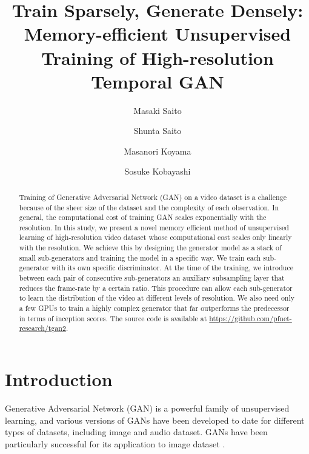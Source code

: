 \documentclass[twocolumn]{svjour3}
\begin{document}
\title{Train Sparsely, Generate Densely: Memory-efficient Unsupervised Training of High-resolution Temporal GAN}




\author{Masaki Saito \and Shunta Saito \and Masanori Koyama \and Sosuke Kobayashi}




\date{}



\maketitle

\begin{abstract}
Training of Generative Adversarial Network (GAN) on a video dataset is a challenge because of the sheer size of the dataset and the complexity of each observation.
In general, the computational cost of training GAN scales exponentially with the resolution.
In this study, we present a novel memory efficient method of unsupervised learning of high-resolution video dataset whose computational cost scales only linearly with the resolution.
We achieve this by designing the generator model as a stack of small sub-generators and training the model in a specific way.
We train each sub-generator with its own specific discriminator.
At the time of the training, we introduce between each pair of consecutive sub-generators an auxiliary subsampling layer that reduces the frame-rate by a certain ratio.
This procedure can allow each sub-generator to learn the distribution of the video at different levels of resolution.
We also need only a few GPUs to train a highly complex generator that far outperforms the predecessor in terms of inception scores.
The source code is available at \url{https://github.com/pfnet-research/tgan2}.
\end{abstract}

\section{Introduction}
\label{sec:introduction}
Generative Adversarial Network (GAN) is a powerful family of unsupervised learning, and various versions of GANs have been developed to date for different types of datasets, including image and audio dataset.
GANs have been particularly successful for its application to image dataset \cite{Radford2016,Miyato2018,Brock2018}.
\end{document}
